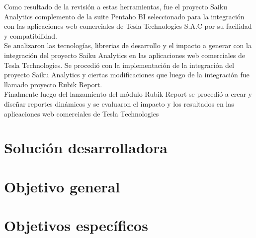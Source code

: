 \begin{spacing}{1.5}
	Como resultado de la revisión a estas herramientas, fue el proyecto Saiku Analytics complemento de la suite Pentaho BI seleccionado para la integración con las aplicaciones web comerciales de Tesla Technologies S.A.C por su facilidad y compatibilidad.\\
	Se analizaron las tecnologías, librerias de desarrollo y el impacto a generar  con la integración del proyecto Saiku Analytics en las aplicaciones web comerciales de Tesla Technologies.
	Se procedió con la implementación de la integración del proyecto Saiku Analytics y ciertas modificaciones que luego de la integración fue llamado proyecto Rubik Report.\\
	Finalmente luego del lanzamiento del módulo Rubik Report se procedió a crear y diseñar reportes dinámicos y se evaluaron el impacto y los resultados en las aplicaciones web comerciales de Tesla Technologies
\end{spacing}

\begin{figure}[h]
	\centering 
{}
\end{figure}

\section{Soluci\'{o}n desarrolladora}
\begin{spacing}{1.5}
\end{spacing}
\section{Objetivo general}
\begin{spacing}{1.5}
\end{spacing}
\section{Objetivos espec\'{i}ficos}
\begin{spacing}{1.5}
\end{spacing}


	
